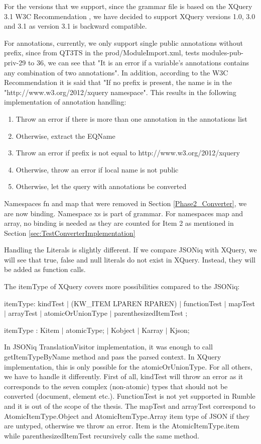 For the versions that we support, since the grammar file is based on the XQuery 3.1 W3C Recommendation \cite{XQueryRecommendation}, we have decided to support XQuery versions 1.0, 3.0 and 3.1 as version  3.1 is backward compatible.

For annotations, currently, we only support single public annotations without prefix, since from QT3TS in the prod/ModuleImport.xml, tests modules-pub-priv-29 to 36, we can see that "It is an error if a variable's annotations contains any combination of two annotations". In addition, according to the W3C Recommendation \cite{XQueryRecommendation} it is said that "If no prefix is present, the name is in the "http://www.w3.org/2012/xquery namespace". This results in the following implementation of annotation handling:
\begin{enumerate}
	\item Throw an error if there is more than one annotation in the annotations list
	\item Otherwise, extract the EQName
	\item Throw an error if prefix is not equal to http://www.w3.org/2012/xquery 
	\item Otherwise, throw an error if local name is not public
	\item Otherwise, let the query with annotations be converted
\end{enumerate}

Namespaces fn and map that were removed in Section \ref{Phase2_Converter}, we are now binding. Namespace xs is part of grammar. For namespaces map and array, no binding is needed as they are counted for Item 2 as mentioned in Section \ref{sec:TestConverterImplementation}

Handling the Literals is slightly different. If we compare JSONiq with XQuery, we will see that true, false and null literals do not exist in XQuery. Instead, they will be added as function calls.

The itemType of XQuery covers more possibilities compared to the JSONiq:

itemType: kindTest
$|$ (KW\_ITEM LPAREN RPAREN)
$|$ functionTest
$|$ mapTest
$|$ arrayTest
$|$ atomicOrUnionType
$|$ parenthesizedItemTest ;

itemType                : Kitem
$|$ atomicType;
$|$ Kobject
$|$ Karray
$|$ Kjson;

In JSONiq TranslationVisitor implementation, it was enough to call getItemTypeByName method and pass the parsed context. In XQuery implementation, this is only possible for the atomicOrUnionType. For all others, we have to handle it differently. First of all, kindTest will throw an error as it corresponds to the seven complex (non-atomic) types that should not be converted (document, element etc.). FunctionTest is not yet supported in Rumble and it is out of the scope of the thesis. The mapTest and arrayTest correspond to AtomicItemType.Object and AtomicItemType.Array item type of JSON if they are untyped, otherwise we throw an error. Item is the AtomicItemType.item while parenthesizedItemTest recursively calls the same method.

